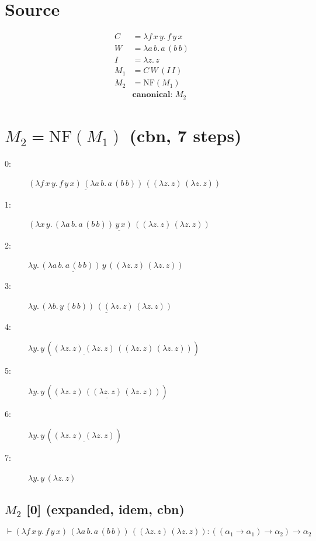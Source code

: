 \documentclass[a4paper,landscape]{article}
\begin{document}
\section*{Source}
\begin{align*}
C &= \lambda f\,x\,y.\,f\,y\,x \\
W &= \lambda a\,b.\,a\,(b\,b) \\
I &= \lambda z.\,z \\
M_{1} &= C\,W\,(I\,I) \\
M_{2} &= \mathrm{NF}(M_{1}) \\
&\textbf{canonical: } M_{2}
\end{align*}

\section*{$M_{2} = \mathrm{NF}(M_{1})$ \quad \normalsize(cbn, 7 steps)}
\begin{description}
  \item[0:] $\underline{(\lambda f\,x\,y.\,f\,y\,x)\,(\lambda a\,b.\,a\,(b\,b))}\,((\lambda z.\,z)\,(\lambda z.\,z))$
  \item[1:] $\underline{(\lambda x\,y.\,(\lambda a\,b.\,a\,(b\,b))\,y\,x)\,((\lambda z.\,z)\,(\lambda z.\,z))}$
  \item[2:] $\lambda y.\,\underline{(\lambda a\,b.\,a\,(b\,b))\,y}\,((\lambda z.\,z)\,(\lambda z.\,z))$
  \item[3:] $\lambda y.\,\underline{(\lambda b.\,y\,(b\,b))\,((\lambda z.\,z)\,(\lambda z.\,z))}$
  \item[4:] $\lambda y.\,y\,(\underline{(\lambda z.\,z)\,(\lambda z.\,z)}\,((\lambda z.\,z)\,(\lambda z.\,z)))$
  \item[5:] $\lambda y.\,y\,(\underline{(\lambda z.\,z)\,((\lambda z.\,z)\,(\lambda z.\,z))})$
  \item[6:] $\lambda y.\,y\,(\underline{(\lambda z.\,z)\,(\lambda z.\,z)})$
  \item[7:] $\lambda y.\,y\,(\lambda z.\,z)$
\end{description}

\subsection*{$M_{2}$ [0] \quad \normalsize(expanded, idem, cbn)}

\[  \vdash (\lambda f\,x\,y.\,f\,y\,x)\,(\lambda a\,b.\,a\,(b\,b))\,((\lambda z.\,z)\,(\lambda z.\,z)) : ((\alpha_{1} \to \alpha_{1}) \to \alpha_{2}) \to \alpha_{2} \]
\end{document}
